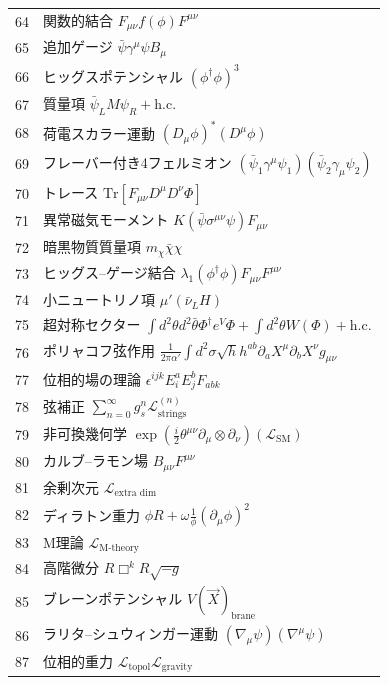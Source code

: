 \documentclass[13pt,a4paper]{ltjsarticle}
\begin{document}
\begin{longtable}{r l}
		64 & 関数的結合 \(F_{\mu\nu}f(\phi)F^{\mu\nu}\) \\
		65 & 追加ゲージ \(\bar{\psi}\gamma^\mu\psi B_\mu\) \\
		66 & ヒッグスポテンシャル \((\phi^\dagger\phi)^3\) \\
		67 & 質量項 \(\bar{\psi}_L M \psi_R + \text{h.c.}\) \\
		68 & 荷電スカラー運動 \((D_\mu\phi)^*(D^\mu\phi)\) \\
		69 & フレーバー付き4フェルミオン \((\bar{\psi}_1\gamma^\mu\psi_1)(\bar{\psi}_2\gamma_\mu\psi_2)\) \\
		70 & トレース \(\mathrm{Tr}[F_{\mu\nu}D^\mu D^\nu\Phi]\) \\
		71 & 異常磁気モーメント \(K(\bar{\psi}\sigma^{\mu\nu}\psi)F_{\mu\nu}\) \\
		72 & 暗黒物質質量項 \(m_\chi\bar{\chi}\chi\) \\
		73 & ヒッグス–ゲージ結合 \(\lambda_1(\phi^\dagger\phi)F_{\mu\nu}F^{\mu\nu}\) \\
		74 & 小ニュートリノ項 \(\mu'(\bar{\nu}_L H)\) \\
		75 & 超対称セクター \(\int d^2\theta d^2\bar{\theta}\Phi^\dagger e^V\Phi + \int d^2\theta W(\Phi) + \text{h.c.}\) \\
		76 & ポリャコフ弦作用 \(\frac{1}{2\pi\alpha'}\int d^2\sigma\sqrt{h}h^{ab}\partial_a X^\mu\partial_b X^\nu g_{\mu\nu}\) \\
		77 & 位相的場の理論 \(\epsilon^{ijk}E_i^a E_j^b F_{ab k}\) \\
		78 & 弦補正 \(\sum_{n=0}^\infty g_s^n \mathcal{L}^{(n)}_{\text{strings}}\) \\
		79 & 非可換幾何学 \(\exp\left(\frac{i}{2}\theta^{\mu\nu}\partial_\mu\otimes\partial_\nu\right)(\mathcal{L}_{\text{SM}})\) \\
		80 & カルブ–ラモン場 \(B_{\mu\nu}F^{\mu\nu}\) \\
		81 & 余剰次元 \(\mathcal{L}_{\text{extra dim}}\) \\
		82 & ディラトン重力 \(\phi R + \omega\frac{1}{\phi}(\partial_\mu\phi)^2\) \\
		83 & M理論 \(\mathcal{L}_{\text{M‑theory}}\) \\
		84 & 高階微分 \(R\Box^k R\sqrt{-g}\) \\
		85 & ブレーンポテンシャル \(V(\vec{X})_{\text{brane}}\) \\
		86 & ラリタ–シュウィンガー運動 \((\nabla_\mu\psi)(\nabla^\mu\psi)\) \\
		87 & 位相的重力 \(\mathcal{L}_{\text{topol}}\mathcal{L}_{\text{gravity}}\) \\

\end{longtable}
\end{document}
